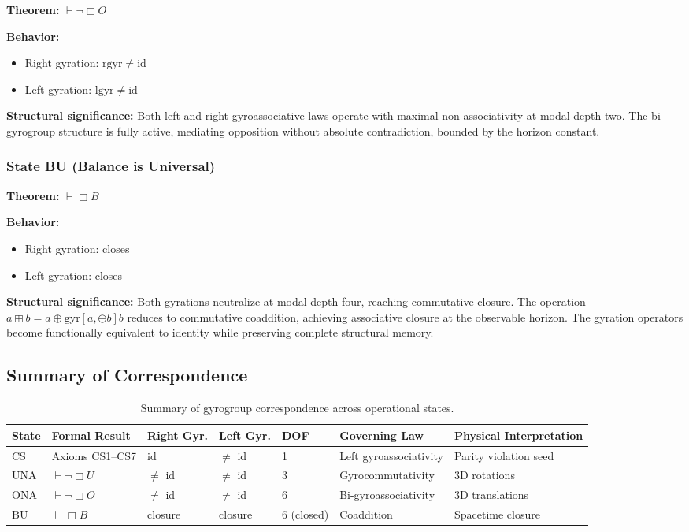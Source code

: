\documentclass[11pt,a4paper]{article}
\theoremstyle{definition}
\theoremstyle{remark}
\begin{document}
\textbf{Theorem:} $\vdash \neg\Box O$

\textbf{Behavior:}
\begin{itemize}
\item Right gyration: $\mathrm{rgyr} \neq \mathrm{id}$
\item Left gyration: $\mathrm{lgyr} \neq \mathrm{id}$
\end{itemize}

\textbf{Structural significance:} Both left and right gyroassociative laws operate with maximal non-associativity at modal depth two. The bi-gyrogroup structure is fully active, mediating opposition without absolute contradiction, bounded by the horizon constant.

\subsubsection{State BU (Balance is Universal)}

\textbf{Theorem:} $\vdash \Box B$

\textbf{Behavior:}
\begin{itemize}
\item Right gyration: closes
\item Left gyration: closes
\end{itemize}

\textbf{Structural significance:} Both gyrations neutralize at modal depth four, reaching commutative closure. The operation $a \boxplus b = a \oplus \mathrm{gyr}[a, \ominus b]b$ reduces to commutative coaddition, achieving associative closure at the observable horizon. The gyration operators become functionally equivalent to identity while preserving complete structural memory.

\subsection{Summary of Correspondence}

\begin{table}[h]
\centering
\begin{tabular}{lllllll}
\toprule
State & Formal Result & Right Gyr. & Left Gyr. & DOF & Governing Law & Physical Interpretation \\
\midrule
CS & Axioms CS1--CS7 & id & $\neq$ id & 1 & Left gyroassociativity & Parity violation seed \\
UNA & $\vdash \neg\Box U$ & $\neq$ id & $\neq$ id & 3 & Gyrocommutativity & 3D rotations \\
ONA & $\vdash \neg\Box O$ & $\neq$ id & $\neq$ id & 6 & Bi-gyroassociativity & 3D translations \\
BU & $\vdash \Box B$ & closure & closure & 6 (closed) & Coaddition & Spacetime closure \\
\bottomrule
\end{tabular}
\caption{Summary of gyrogroup correspondence across operational states.}
\end{table}
\end{document}
